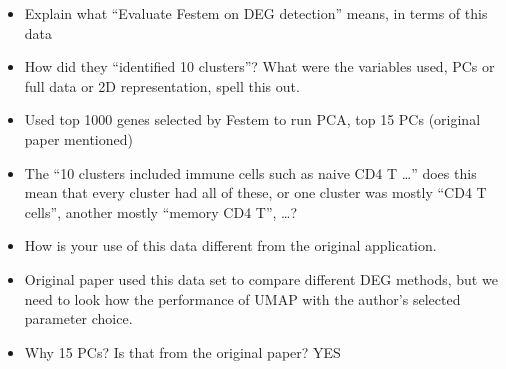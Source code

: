 \documentclass[
  12pt]{article}
\begin{document}
\begin{itemize}
\item
  Explain what ``Evaluate Festem on DEG detection'' means, in terms of
  this data
\item
  How did they ``identified 10 clusters''? What were the variables used,
  PCs or full data or 2D representation, spell this out.
\item
  Used top 1000 genes selected by Festem to run PCA, top 15 PCs
  (original paper mentioned)
\item
  The ``10 clusters included immune cells such as naive CD4 T \ldots{}''
  does this mean that every cluster had all of these, or one cluster was
  mostly ``CD4 T cells'', another mostly ``memory CD4 T'', \ldots?
\item
  How is your use of this data different from the original application.
\item
  Original paper used this data set to compare different DEG methods,
  but we need to look how the performance of UMAP with the author's
  selected parameter choice.
\item
  Why 15 PCs? Is that from the original paper? YES
\end{itemize}

\citet{Chen2023}
\end{document}
